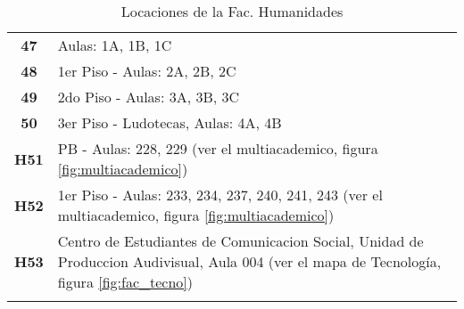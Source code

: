 \begin{longtable}{ c  X }
      \textbf{47}
      &
      Aulas: 1A, 1B, 1C
      \\


      \textbf{48}
      &
      1{\tiny er} Piso - Aulas: 2A, 2B, 2C
      \\


      \textbf{49}
      &
      2{\tiny do} Piso - Aulas: 3A, 3B, 3C
      \\


      \textbf{50}
      &
      3{\tiny er} Piso - Ludotecas, Aulas: 4A, 4B
      \\

      \textbf{H51}
      &
      PB - Aulas: 228, 229 (ver el multiacademico, figura \ref{fig:multiacademico})
      \\

      \textbf{H52}
      &
      1{\tiny er} Piso - Aulas: 233, 234, 237, 240, 241, 243 (ver el multiacademico, figura \ref{fig:multiacademico})
      \\

      \textbf{H53}
      &
      Centro de Estudiantes de Comunicacion Social, Unidad de Produccion Audivisual, Aula 004 (ver el mapa de Tecnología, figura \ref{fig:fac_tecno})
      \\


      \bottomrule
      \caption{Locaciones de la Fac. Humanidades}
      \label{tab:lugares_humanidades}
    \end{longtable}
